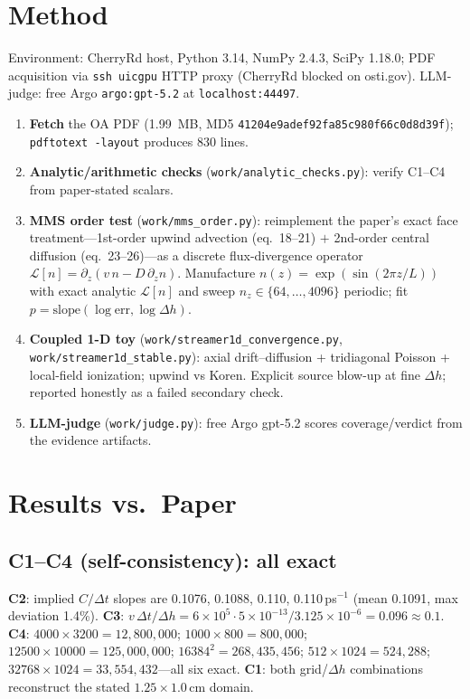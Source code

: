 \documentclass[11pt]{article}
\begin{document}
\section{Method}
Environment: CherryRd host, Python 3.14, NumPy 2.4.3, SciPy 1.18.0; PDF acquisition
via \texttt{ssh uicgpu} HTTP proxy (CherryRd blocked on osti.gov). LLM-judge: free
Argo \texttt{argo:gpt-5.2} at \texttt{localhost:44497}.
\begin{enumerate}
  \item \textbf{Fetch} the OA PDF (\SI{1.99}{MB}, MD5 \texttt{41204e9adef92fa85c980f66c0d8d39f});
        \texttt{pdftotext -layout} produces 830 lines.
  \item \textbf{Analytic/arithmetic checks} (\texttt{work/analytic\_checks.py}):
        verify C1--C4 from paper-stated scalars.
  \item \textbf{MMS order test} (\texttt{work/mms\_order.py}): reimplement the
        paper's exact face treatment---1st-order upwind advection (eq.~18--21)
        $+$ 2nd-order central diffusion (eq.~23--26)---as a discrete
        flux-divergence operator $\mathcal{L}[n]=\partial_z(v\,n - D\,\partial_z n)$.
        Manufacture $n(z)=\exp(\sin(2\pi z/L))$ with exact analytic $\mathcal{L}[n]$
        and sweep $n_z \in \{64,\dots,4096\}$ periodic; fit
        $p = \text{slope}(\log \text{err},\log \Delta h)$.
  \item \textbf{Coupled 1-D toy} (\texttt{work/streamer1d\_convergence.py},
        \texttt{work/streamer1d\_stable.py}): axial drift--diffusion + tridiagonal
        Poisson + local-field ionization; upwind vs Koren. Explicit source
        blow-up at fine $\Delta h$; reported honestly as a failed secondary check.
  \item \textbf{LLM-judge} (\texttt{work/judge.py}): free Argo gpt-5.2 scores
        coverage/verdict from the evidence artifacts.
\end{enumerate}

\section{Results vs.\ Paper}
\subsection*{C1--C4 (self-consistency): all exact}
\textbf{C2}: implied $C/\Delta t$ slopes are 0.1076, 0.1088, 0.110, 0.110\,ps$^{-1}$
(mean 0.1091, max deviation 1.4\%). \textbf{C3}: $v\,\Delta t/\Delta h =
6{\times}10^{5}\cdot 5{\times}10^{-13}/3.125{\times}10^{-6} = 0.096 \approx 0.1$.
\textbf{C4}: $4000{\times}3200=12{,}800{,}000$; $1000{\times}800=800{,}000$;
$12500{\times}10000=125{,}000{,}000$; $16384^{2}=268{,}435{,}456$;
$512{\times}1024=524{,}288$; $32768{\times}1024=33{,}554{,}432$---all six exact.
\textbf{C1}: both grid/$\Delta h$ combinations reconstruct the stated
$1.25\times 1.0$\,cm domain.
\end{document}

